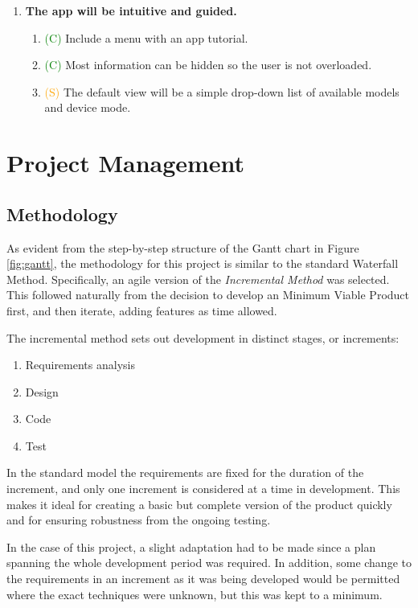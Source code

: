 \documentclass[12pt, a4paper]{article}
\newcommand{\should}[1]{\textcolor{orange}{#1}}
\newcommand{\could}[1]{\textcolor{green}{#1}}
\begin{document}
\begin{enumerate}[label=\Roman*.]
\item \textbf{The app will be intuitive and guided.}
    \begin{enumerate}[label=\arabic*.]
    \item \could{(C)} Include a menu with an app tutorial.
    \item \could{(C)} Most information can be hidden so the user is not overloaded.
    \item \should{(S)} The default view will be a simple drop-down list of available models and device mode.
    \end{enumerate}
\end{enumerate}

\newpage
\section{Project Management}

\subsection{Methodology}
\label{methodology}
As evident from the step-by-step structure of the Gantt chart in Figure \ref{fig:gantt}, the methodology for this project is similar to the standard Waterfall Method. Specifically, an agile version of the \textit{Incremental Method} \cite{management:incremental} was selected. This followed naturally from the decision to develop an Minimum Viable Product first, and then iterate, adding features as time allowed. 

The incremental method sets out development in distinct stages, or increments:
\begin{enumerate}
    \item Requirements analysis
    \item Design
    \item Code 
    \item Test
\end{enumerate}
In the standard model the requirements are fixed for the duration of the increment, and only one increment is considered at a time in development. This makes it ideal for creating a basic but complete version of the product quickly and for ensuring robustness from the ongoing testing. 

In the case of this project, a slight adaptation had to be made since a plan spanning the whole development period was required. In addition, some change to the requirements in an increment as it was being developed would be permitted where the exact techniques were unknown, but this was kept to a minimum.  
\end{document}

